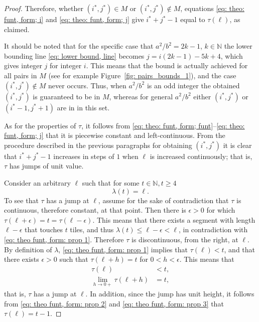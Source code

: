 \documentclass[12pt, a4paper]{article}
\newcommand{\funt}{\tau} %
\newcommand{\funl}{\lambda} %
\newcommand{\len}{\ell} %
\newcommand{\tiles}{t} %
\newcommand{\isoli}{i^\ast}
\newcommand{\jsoli}{j^\ast}
\newcommand{\mss}{M}
\begin{document}
\begin{proof}
Therefore, whether $(\isoli,\jsoli) \in \mss$ or $(\isoli,\jsoli) \notin \mss$, equations \eqref{eq: theo: funt, form; i} and \eqref{eq: theo: funt, form; j} give $\isoli+\jsoli-1$ equal to $\funt(\len)$, as claimed.

It should be noted that for the specific case that $a^2/b^2 = 2k-1$, $k \in \mathbb N$ the lower bounding line \eqref{eq: lower bound, line} becomes $j = i(2k-1)-5k+4$, which gives integer $j$ for integer $i$. This means that the bound is actually achieved for all pairs in $\mss$ (see for example Figure~\ref{fig: pairs_bounds_1}), and the case $(\isoli,\jsoli) \notin \mss$ never occurs. Thus, when $a^2/b^2$ is an odd integer the obtained $(\isoli,\jsoli)$ is guaranteed to be in $\mss$, whereas for general $a^2/b^2$ either $(\isoli,\jsoli)$ or $(\isoli-1,\jsoli+1)$ are in in this set.

As for the properties of $\funt$, it follows from \eqref{eq: theo: funt, form; funt}--\eqref{eq: theo: funt, form; j} that it is piecewise constant and left-continuous. From the procedure described in the previous paragraphs for obtaining $(\isoli, \jsoli)$ it is clear that $\isoli+\jsoli-1$ increases in steps of $1$ when $\len$ is increased continuously; that is, $\funt$ has jumps of unit value.

Consider an arbitrary $\len$ such that for some $\tiles \in \mathbb N, \tiles \geq 4$
\begin{equation}
\label{eq: theo funt, form: prop 1}
\funl(\tiles)=\len.
\end{equation}
To see that $\funt$ has a jump at $\len$, assume for the sake of contradiction that $\funt$ is continuous, therefore constant, at that point. Then there is $\epsilon > 0$ for which $\funt(\len+\epsilon) = \tiles = \funt(\len-\epsilon)$. This means that there exists a segment with length $\len-\epsilon$ that touches $\tiles$ tiles, and thus $\funl(\tiles) \leq \len-\epsilon < \len$, in contradiction with \eqref{eq: theo funt, form: prop 1}. Therefore $\funt$ is discontinuous, from the right, at $\len$. By definition of $\funl$, \eqref{eq: theo funt, form: prop 1} implies that $\funt(\len) < \tiles$, and that there exists $\epsilon > 0$ such that $\funt(\len+h) = \tiles$ for $0 < h < \epsilon$. This means that
\begin{align}
\label{eq: theo funt, form: prop 2}
\funt(\len) &< \tiles, \\
\label{eq: theo funt, form: prop 3}
\lim_{h \rightarrow 0+} \funt(\len+h) &= \tiles,
\end{align}
that is, $\funt$ has a jump at $\len$. In addition, since the jump has unit height, it follows from \eqref{eq: theo funt, form: prop 2} and \eqref{eq: theo funt, form: prop 3}  that $\funt(\len) = \tiles-1$.


\end{proof}
\end{document}

